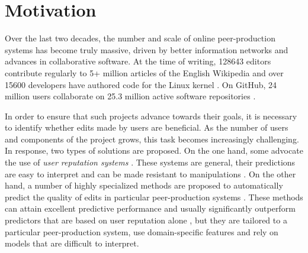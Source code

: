 \section{Motivation}
\label{pps:sec:intro}

Over the last two decades, the number and scale of online peer-production systems has become truly massive, driven by better information networks and advances in collaborative software.
At the time of writing, \num{128643} editors contribute regularly to \num{5}+ million articles of the English Wikipedia \citep{wikipedia2017wikipedians} and over \num{15600} developers have authored code for the Linux kernel \citep{corbet2017linux}.
On GitHub, \num{24} million users collaborate on \num{25.3} million active software repositories \citep{github2017octoverse}.

In order to ensure that such projects advance towards their goals, it is necessary to identify whether edits made by users are beneficial.
As the number of users and components of the project grows, this task becomes increasingly challenging.
In response, two types of solutions are proposed.
On the one hand, some advocate the use of \emph{user reputation systems} \citep{resnick2000reputation, adler2007content}.
These systems are general, their predictions are easy to interpret and can be made resistant to manipulations \citep{dealfaro2013content}.
On the other hand, a number of highly specialized methods are proposed to automatically predict the quality of edits in particular peer-production systems \citep{druck2008learning, wikimedia2015artificial}.
These methods can attain excellent predictive performance \citep{heindorf2016vandalism} and usually significantly outperform predictors that are based on user reputation alone \citep{druck2008learning}, but they are tailored to a particular peer-production system, use domain-specific features and rely on models that are difficult to interpret.

